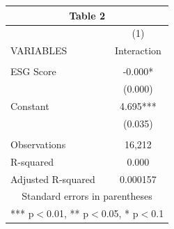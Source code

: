 \begin{tabular}{lc}
\multicolumn{2}{c}{Table 2} \\ \hline
 & (1) \\
VARIABLES & Interaction \\ \hline
 &  \\
ESG Score & -0.000* \\
 & (0.000) \\
Constant & 4.695*** \\
 & (0.035) \\
 &  \\
Observations & 16,212 \\
R-squared & 0.000 \\
 Adjusted R-squared & 0.000157 \\ \hline
\multicolumn{2}{c}{ Standard errors in parentheses} \\
\multicolumn{2}{c}{ *** p$<$0.01, ** p$<$0.05, * p$<$0.1} \\
\end{tabular}
